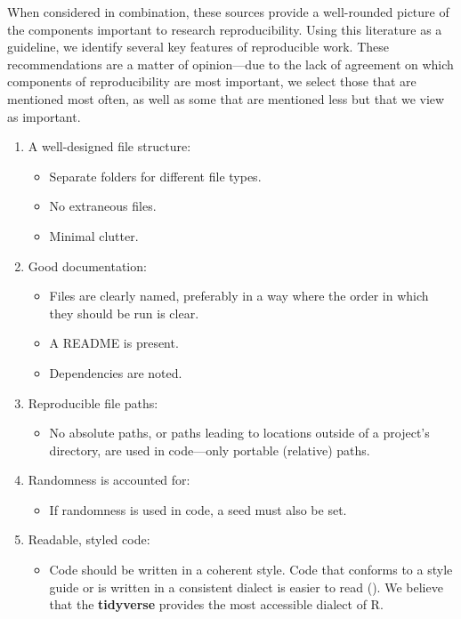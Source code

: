 \documentclass[APA,LATO1COL]{WileyNJD-v2}\usepackage[]{graphicx}\usepackage[]{color}
\newcommand{\R}{\textsf{R}\xspace}
\newcommand{\pkg}[1]{\textbf{#1}}
\begin{document}
When considered in combination, these sources provide a well-rounded picture of the components important to research reproducibility. Using this literature as a guideline, we identify several key features of reproducible work. These recommendations are a matter of opinion---due to the lack of agreement on which components of reproducibility are most important, we select those that are mentioned most often, as well as some that are mentioned less but that we view as important. 
\vspace{3mm}

\begin{enumerate} [nolistsep]
\item A well-designed file structure:
  \begin{itemize}[noitemsep]
  \item Separate folders for different file types.
  \item No extraneous files.
  \item Minimal clutter.
  \end{itemize}
\item Good documentation:
  \begin{itemize} [noitemsep]
  \item Files are clearly named, preferably in a way where the order in which they should be run is clear.
  \item A README is present.
  \item Dependencies are noted.
  \end{itemize}
\item Reproducible file paths:
  \begin{itemize}
  \item No absolute paths, or paths leading to locations outside of a project's directory, are used in code---only portable (relative) paths.
  \end{itemize}
\item Randomness is accounted for:
  \begin{itemize}
  \item If randomness is used in code, a seed must also be set.
  \end{itemize}
\item Readable, styled code:
  \begin{itemize}
  \item Code should be written in a coherent style. Code that conforms to a style guide or is written in a consistent dialect is easier to read (\cite{hermans2017programming}). We believe that the \pkg{tidyverse} provides the most accessible dialect of \R.
  \end{itemize}
\end{enumerate}
\end{document}
